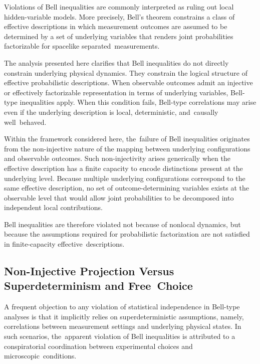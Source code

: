 \documentclass[quantumrep,article,accept,pdftex,oneauthor]{Definitions/mdpi}
\theoremstyle{remark}
\begin{document}
    Violations of Bell inequalities are commonly interpreted as ruling out local
    hidden-variable models.
    More precisely, Bell’s theorem constrains a class of effective descriptions in which
    measurement outcomes are assumed to be determined by a set of underlying variables
    that renders joint probabilities factorizable for spacelike separated~measurements.

    The analysis presented here clarifies that Bell inequalities do not directly constrain
    underlying physical dynamics.
    They constrain the logical structure of effective probabilistic descriptions.
    When observable outcomes admit an injective or effectively factorizable representation
    in terms of underlying variables, Bell-type inequalities apply.
    When this condition fails, Bell-type correlations may arise even if the underlying
    description is local, deterministic, and~causally well~behaved.

    Within the framework considered here, the~failure of Bell inequalities originates
    from the non-injective nature of the mapping between underlying configurations and
    observable outcomes.
    Such non-injectivity arises generically when the effective description has a finite
    capacity to encode distinctions present at the underlying level.
    Because multiple underlying configurations correspond to the same effective
    description, no set of outcome-determining variables exists at the observable level
    that would allow joint probabilities to be decomposed into independent local
    contributions.

    Bell inequalities are therefore violated not because of nonlocal dynamics, but because the assumptions required for probabilistic factorization are not satisfied
    in finite-capacity effective~descriptions.

  \subsection{Non-Injective Projection Versus Superdeterminism and Free~Choice}
    \label{subsec:free-choice}

    A frequent objection to any violation of statistical independence in Bell-type analyses
    is that it implicitly relies on superdeterministic assumptions, namely, correlations
    between measurement settings and underlying physical states.
    In such scenarios, the~apparent violation of Bell inequalities is attributed to a
    conspiratorial coordination between experimental choices and microscopic~conditions.
\end{document}
